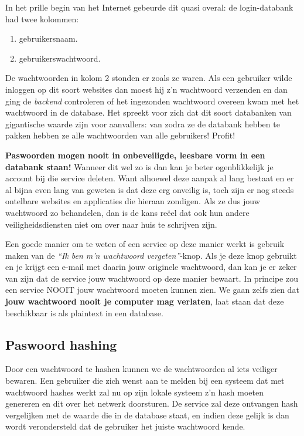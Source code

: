\documentclass[
  10pt,
  dutch,
  paper=a4,
  ,captions=tableheading
]{scrbook}
\providecommand{\tightlist}{%
  \setlength{\itemsep}{0pt}\setlength{\parskip}{0pt}}
\begin{document}
In het prille begin van het Internet gebeurde dit quasi overal: de
login-databank had twee kolommen:

\begin{enumerate}
\def\labelenumi{\arabic{enumi}.}
\tightlist
\item
  gebruikersnaam.
\item
  gebruikerswachtwoord.
\end{enumerate}

De wachtwoorden in kolom 2 stonden er zoals ze waren. Als een gebruiker
wilde inloggen op dit soort websites dan moest hij z'n wachtwoord
verzenden en dan ging de \emph{backend} controleren of het ingezonden
wachtwoord overeen kwam met het wachtwoord in de database. Het spreekt
voor zich dat dit soort databanken van gigantische waarde zijn voor
aanvallers: van zodra ze de databank hebben te pakken hebben ze alle
wachtwoorden van alle gebruikers! Profit!

\textbf{Paswoorden mogen nooit in onbeveiligde, leesbare vorm in een
databank staan!} Wanneer dit wel zo is dan kan je beter ogenblikkelijk
je account bij die service deleten. Want alhoewel deze aanpak al lang
bestaat en er al bijna even lang van geweten is dat deze erg onveilig
is, toch zijn er nog steeds ontelbare websites en applicaties die
hieraan zondigen. Als ze dus jouw wachtwoord zo behandelen, dan is de
kans reëel dat ook hun andere veiligheidsdiensten niet om over naar huis
te schrijven zijn.

Een goede manier om te weten of een service op deze manier werkt is
gebruik maken van de \emph{``Ik ben m'n wachtwoord vergeten''}-knop. Als
je deze knop gebruikt en je krijgt een e-mail met daarin jouw originele
wachtwoord, dan kan je er zeker van zijn dat de service jouw wachtwoord
op deze manier bewaart. In principe zou een service NOOIT jouw
wachtwoord moeten kunnen zien. We gaan zelfs zien dat \textbf{jouw
wachtwoord nooit je computer mag verlaten}, laat staan dat deze
beschikbaar is als plaintext in een database.

\subsection{Paswoord hashing}\label{paswoord-hashing}

Door een wachtwoord te hashen kunnen we de wachtwoorden al iets veiliger
bewaren. Een gebruiker die zich wenst aan te melden bij een systeem dat
met wachtwoord hashes werkt zal nu op zijn lokale systeem z'n hash
moeten genereren en dit over het netwerk doorsturen. De service zal deze
ontvangen hash vergelijken met de waarde die in de database staat, en
indien deze gelijk is dan wordt verondersteld dat de gebruiker het
juiste wachtwoord kende.
\end{document}

